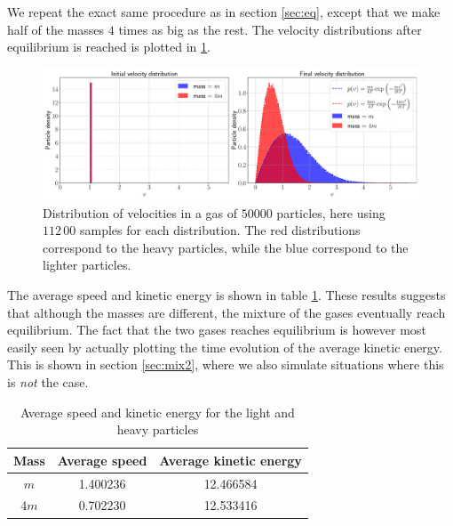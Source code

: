 We repeat the exact same procedure as in section \ref{sec:eq}, except that we make half of the masses $4$ times as big as the rest. The velocity distributions after equilibrium is reached is plotted in \ref{fig:dist_3}.

\begin{figure}[htb]
	\centering
	\includegraphics[width=\textwidth]{../fig/distribution_2}
	\caption{Distribution of velocities in a gas of $50000$ particles, here using $112\,00$ samples for each distribution. The red distributions correspond to the heavy particles, while the blue correspond to the lighter particles.}
	\label{fig:dist_3}
\end{figure}

The average speed and kinetic energy is shown in table \ref{tab:averages}. These results suggests that although the masses are different, the mixture of the gases eventually reach equilibrium. The fact that the two gases reaches equilibrium is however most easily seen by actually plotting the time evolution of the average kinetic energy. This is shown in section \ref{sec:mix2}, where we also simulate situations where this is \textit{not} the case.

\begin{table}[htb]
	\centering 
	\caption{Average speed and kinetic energy for the light and heavy particles}
	\begin{tabular}{ccc}
		\toprule
		\textbf{Mass }& \textbf{Average speed} & \textbf{Average kinetic energy} \\
		\midrule
		$m$   & 1.400236 & 12.466584 \\
		$4m$  & 0.702230 & 12.533416 \\
		\bottomrule
	\end{tabular}
	\label{tab:averages}
\end{table}
